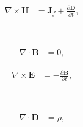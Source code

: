 \noindent\begin{minipage}{0.5\textwidth}
\begin{align}
    \nabla \times \mathbf{H} &= \mathbf{J}_f + \frac{\partial \mathbf{D}}{\partial t} \text{,} \label{eqn:amperesLaw}
\end{align}
\end{minipage}~\begin{minipage}{0.5\textwidth}
\begin{align}
    \nabla \cdot \mathbf{B} &= 0 \text{,} \label{eqn:gaussLawForMagnetism}
\end{align}
\end{minipage}
\noindent\begin{minipage}{0.5\textwidth}
\begin{align}
    \nabla \times \mathbf{E} &= -\frac{\partial \mathbf{B}}{\partial t} \text{,} \label{eqn:maxwellFaradayEquation}
\end{align}
\end{minipage}~\begin{minipage}{0.5\textwidth}
\begin{align}
    \nabla \cdot \mathbf{D} &= \rho \text{,} \label{eqn:gaussLaw}
\end{align}
\end{minipage}
\vspace{2mm}


